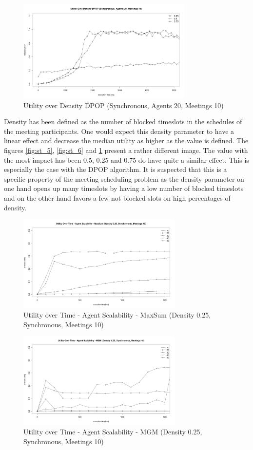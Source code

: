 \begin{figure}[H]
\centering
\includegraphics[width=330px]{graphics/experiments/static/st_7}
\caption{Utility over Density DPOP (Synchronous, Agents 20, Meetings 10)}
\label{fig:st_7}
\end{figure}
Density has been defined as the number of blocked timeslots in the schedules of the meeting participants. One would expect this density parameter to have a linear effect and decrease the median utility as higher as the value is defined. The figures \ref{fig:st_5}, \ref{fig:st_6} and \ref{fig:st_7}  present a rather different image. The value with the most impact has been 0.5, 0.25 and 0.75 do have quite a similar effect. This is especially the case with the DPOP algorithm. It is suspected that this is a specific property of the meeting scheduling problem as the density parameter on one hand opens up many timeslots by having a low number of blocked timeslots and on the other hand favors a few not blocked slots on high percentages of density.
\begin{figure}[H]
\centering
\includegraphics[width=310px]{graphics/experiments/static/st_8}
\caption{Utility over Time - Agent Scalability - MaxSum (Density 0.25, Synchronous, Meetings 10)}
\label{fig:st_8}
\end{figure}
\begin{figure}[H]
\centering
\includegraphics[width=310px]{graphics/experiments/static/st_9}
\caption{Utility over Time - Agent Scalability - MGM (Density 0.25, Synchronous, Meetings 10)}
\label{fig:st_9}
\end{figure}
